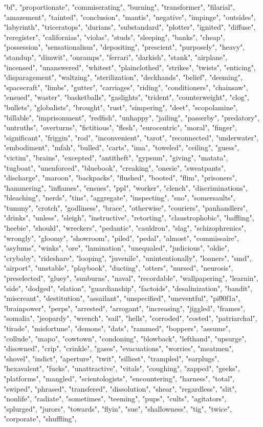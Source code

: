 "bf", "proportionate", "commiserating", "burning", "transformer", "filarial", "amazement", "tainted", "conclusion", "mantis", "negative", "impinge", "outsides", "labyrinth", "triceratops", "durians", "substandard", "plotter", "ignited", "diffuse", "reregister", "californias", "violas", "studs", "sleeping", "banks", "cheap", "possession", "sensationalism", "depositing", "prescient", "purposely", "heavy", "standup", "dimwit", "onramps", "ferrari", "darkish", "stank", "airplane", "incensed", "unanswered", "whitest", "plainclothed", "strikes", "twists", "enticing", "disparagement", "waltzing", "sterilization", "deckhands", "belief", "deeming", "spacecraft", "limbs", "gutter", "carriages", "riding", "conditioners", "chainsaw", "ensued", "waster", "basketballs", "gaslights", "trident", "counterweight", "clog", "bullets", "globalists", "brought", "rust", "simpering", "deet", "scopolamine", "billable", "imprisonment", "redfish", "unhappy", "jailing", "passerby", "predatory", "untruths", "overturns", "fictitious", "flesh", "eurocentric", "moral", "finger", "significant", "friggin", "rod", "inconvenient", "tarot", "reconnected", "underwater", "embodiment", "mfah", "bulled", "carts", "ima", "toweled", "ceiling", "guess", "victim", "brains", "excepted", "antitheft", "gypsum", "giving", "matata", "tugboat", "unenforced", "bluebook", "creaking", "onesie", "sweatpants", "discharge", "maroon", "backpacks", "flushed", "booted", "flim", "prisoners", "hammering", "inflames", "ensues", "ppl", "worker", "clench", "discriminations", "bleaching", "nerds", "tins", "aggregate", "inspecting", "sno", "somersaults", "tummy", "crotch", "godliness", "brace", "otherwise", "couriers", "panhandlers", "drinks", "unless", "sleigh", "instructive", "retorting", "claustrophobic", "baffling", "heebie", "should", "wreckers", "pedantic", "cauldron", "slag", "schizophrenics", "wrongly", "gloomy", "showroom", "piled", "pedal", "almost", "commissaire", "asylums", "winks", "ore", "lamination", "unequaled", "judicious", "oldie", "crybaby", "rideshare", "looping", "juvenile", "unintentionally", "loaners", "smd", "airport", "unstable", "playbook", "ducting", "otters", "nursed", "neurosis", "preselected", "gluey", "sunburns", "naval", "recordable", "wallpapering", "learnin", "side", "dodged", "elation", "guardianship", "factoids", "desalinization", "bandit", "miscreant", "destitution", "assailant", "unspecified", "uneventful", "pi\u00f1a", "brainpower", "perps", "arrested", "arrogant", "increasing", "jiggled", "frames", "somalia", "jeopardy", "wrench", "sail", "hells", "corroded", "costed", "patriarchal", "tirade", "misfortune", "demons", "dats", "rammed", "boppers", "assume", "collude", "mapo", "cowtown", "condoning", "blowback", "lefthand", "upsurge", "disowned", "crip", "crinkle", "gases", "evacuations", "worries", "meatmen", "shovel", "indict", "aperture", "twit", "silliest", "trampled", "earplugs", "hexavalent", "fucks", "unattractive", "vitals", "coughing", "zapped", "geeks", "platforms", "mangled", "scientologists", "encountering", "harness", "total", "swiped", "phrased", "transfered", "dissolution", "shear", "regardless", "slit", "nonlife", "radiate", "sometimes", "teeming", "pups", "cults", "agitators", "splurged", "jurors", "towards", "flyin", "sue", "shallowness", "tig", "twice", "corporate", "shuffling", 